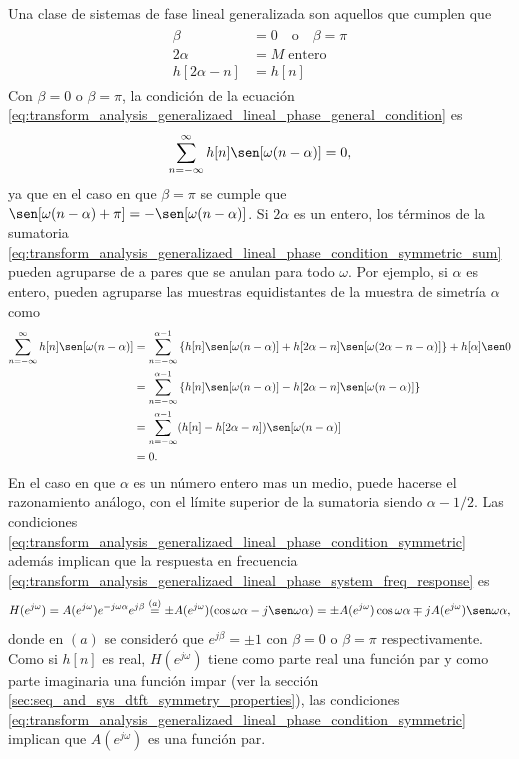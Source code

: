 \documentclass[a4paper]{report}
\begin{document}
Una clase de sistemas de fase lineal generalizada son aquellos que cumplen que 
\begin{gather}
\begin{aligned}\label{eq:transform_analysis_generalizaed_lineal_phase_condition_symmetric}
  \beta&=0\quad\textrm{o}\quad\beta=\pi\\ 
  2\alpha&=M\;\textrm{entero}\\
  h[2\alpha-n]&=h[n]
\end{aligned}
\end{gather}
Con \(\beta=0\) o \(\beta=\pi\), la condición de la ecuación \ref{eq:transform_analysis_generalizaed_lineal_phase_general_condition} es
\begin{equation}\label{eq:transform_analysis_generalizaed_lineal_phase_condition_symmetric_sum}
  \sum_{n=-\infty}^\infty h[n]\sen[\omega(n-\alpha)]=0, 
\end{equation}
ya que en el caso en que \(\beta=\pi\) se cumple que \(\sen[\omega(n-\alpha)+\pi]=-\sen[\omega(n-\alpha)]\). Si \(2\alpha\) es un entero, los términos de la sumatoria \ref{eq:transform_analysis_generalizaed_lineal_phase_condition_symmetric_sum} pueden agruparse de a pares que se anulan para todo \(\omega\). Por ejemplo, si \(\alpha\) es entero, pueden agruparse las muestras equidistantes de la muestra de simetría \(\alpha\) como
\begin{align*}
 \sum_{n=-\infty}^\infty h[n]\sen[\omega(n-\alpha)]&=
  \sum_{n=-\infty}^{\alpha-1}\left\{h[n]\sen[\omega(n-\alpha)]+h[2\alpha-n]\sen[\omega(2\alpha-n-\alpha)]\right\}
  +h[\alpha]\sen0\\
  &=\sum_{n=-\infty}^{\alpha-1}\left\{h[n]\sen[\omega(n-\alpha)]-h[2\alpha-n]\sen[\omega(n-\alpha)]\right\}\\
  &=\sum_{n=-\infty}^{\alpha-1}(h[n]-h[2\alpha-n])\sen[\omega(n-\alpha)]\\
  &=0.
\end{align*}
En el caso en que \(\alpha\) es un número entero mas un medio, puede hacerse el razonamiento análogo, con el límite superior de la sumatoria siendo \(\alpha-1/2\).
Las condiciones \ref{eq:transform_analysis_generalizaed_lineal_phase_condition_symmetric} además implican que la respuesta en frecuencia \ref{eq:transform_analysis_generalizaed_lineal_phase_system_freq_response} es
\[
 H(e^{j\omega})=A(e^{j\omega})e^{-j\omega\alpha}e^{j\beta}
  \overset{(a)}{=}\pm A(e^{j\omega})(\cos\omega\alpha-j\sen\omega\alpha)
  =\pm A(e^{j\omega})\cos\omega\alpha\mp jA(e^{j\omega})\sen\omega\alpha,
\]
donde en \((a)\) se consideró que \(e^{j\beta}=\pm1\) con \(\beta=0\) o \(\beta=\pi\) respectivamente. Como si \(h[n]\) es real, \(H(e^{j\omega})\) tiene como parte real una función par y como parte imaginaria una función impar (ver la sección \ref{sec:seq_and_sys_dtft_symmetry_properties}), las condiciones \ref{eq:transform_analysis_generalizaed_lineal_phase_condition_symmetric} implican que \(A(e^{j\omega})\) es una función par.
\end{document}
